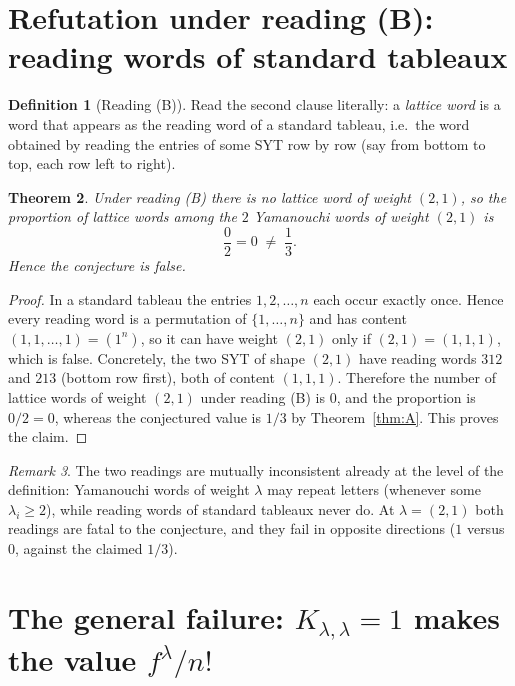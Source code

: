 \documentclass[11pt]{article}
\newtheorem{theorem}{Theorem}
\theoremstyle{definition}
\newtheorem{definition}[theorem]{Definition}
\theoremstyle{remark}
\newtheorem{remark}[theorem]{Remark}
\begin{document}
\section{Refutation under reading (B): reading words of standard tableaux}

\begin{definition}[Reading (B)]
Read the second clause literally: a \emph{lattice word} is a word that appears
as the reading word of a standard tableau, i.e.\ the word obtained by reading
the entries of some SYT row by row (say from bottom to top, each row left to
right).
\end{definition}

\begin{theorem}\label{thm:B}
Under reading (B) there is no lattice word of weight $(2,1)$, so the proportion
of lattice words among the $2$ Yamanouchi words of weight $(2,1)$ is
\[
\frac{0}{2}=0\;\ne\;\frac13 .
\]
Hence the conjecture is false.
\end{theorem}

\begin{proof}
In a standard tableau the entries $1,2,\dots,n$ each occur exactly once. Hence
every reading word is a permutation of $\{1,\dots,n\}$ and has content
$(1,1,\dots,1)=(1^n)$, so it can have weight $(2,1)$ only if
$(2,1)=(1,1,1)$, which is false. Concretely, the two SYT of shape $(2,1)$ have
reading words $312$ and $213$ (bottom row first), both of content $(1,1,1)$.
Therefore the number of lattice words of weight $(2,1)$ under reading (B) is
$0$, and the proportion is $0/2=0$, whereas the conjectured value is $1/3$ by
Theorem~\ref{thm:A}. This proves the claim.
\end{proof}

\begin{remark}
The two readings are mutually inconsistent already at the level of the
definition: Yamanouchi words of weight $\lambda$ may repeat letters (whenever
some $\lambda_i\ge2$), while reading words of standard tableaux never do. At
$\lambda=(2,1)$ both readings are fatal to the conjecture, and they fail in
opposite directions ($1$ versus $0$, against the claimed $1/3$).
\end{remark}

\section{The general failure: $K_{\lambda,\lambda}=1$ makes the value $f^\lambda/n!$}
\label{sec:general}
\end{document}
